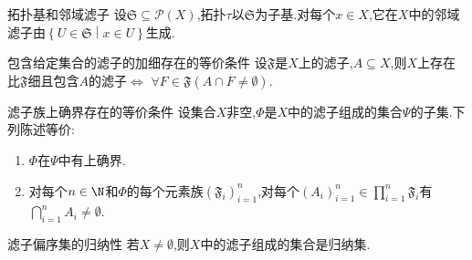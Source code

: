 \begin{example}{拓扑基和邻域滤子}{}
	设$\mathfrak{S}\subseteq\mathcal{P}\left(X\right)$,拓扑$\tau$以$\mathfrak{S}$为子基.对每个$x\in X$,它在$X$中的邻域滤子由$\left\{U\in\mathfrak{S}\middle|x\in U\right\}$生成.
\end{example}

\begin{corollary}{包含给定集合的滤子的加细存在的等价条件}{}
	设$\mathfrak{F}$是$X$上的滤子,$A\subseteq X$,则$X$上存在比$\mathfrak{F}$细且包含$A$的滤子$\iff$ $\forall F\in\mathfrak{F}\left(A\cap F\neq\emptyset\right)$.
\end{corollary}

\begin{corollary}{滤子族上确界存在的等价条件}{}
	设集合$X$非空,$\Phi$是$X$中的滤子组成的集合$\Psi$的子集.下列陈述等价:
	\begin{enumerate}
		\item $\Phi$在$\Psi$中有上确界.
		\item 对每个$n\in\N$和$\Phi$的每个元素族$\left(\mathfrak{F}_{i}\right)_{i=1}^{n}$,对每个$\left(A_{i}\right)_{i=1}^{n}\in\prod\limits_{i=1}^{n}\mathfrak{F}_{i}$有$\bigcap\limits_{i=1}^{n}A_{i}\neq\emptyset$.
	\end{enumerate}
\end{corollary}

\begin{corollary}{滤子偏序集的归纳性}{}
	若$X\neq\emptyset$,则$X$中的滤子组成的集合是归纳集.
\end{corollary}